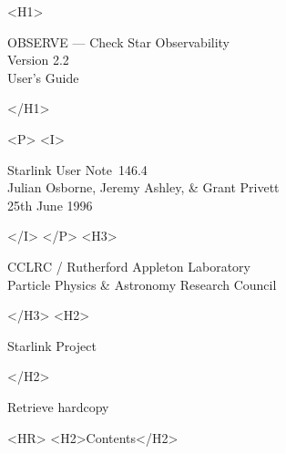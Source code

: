 \documentclass[11pt]{article}
\newcommand{\stardoccategory}  {Starlink User Note}
\newcommand{\stardocsource}    {sun\stardocnumber}
\newcommand{\stardocnumber}    {146.4}
\newcommand{\stardocauthors}   {Julian Osborne, Jeremy Ashley, \& Grant Privett}
\newcommand{\stardocdate}      {25th June 1996}
\newcommand{\stardoctitle}     {OBSERVE --- Check Star Observability}
\newcommand{\stardocversion}   {Version 2.2}
\newcommand{\stardocmanual}    {User's Guide}
\newcommand{\htmladdnormallink}[2]{#1}
\newcommand{\htmladdimg}[1]{}
\newcommand{\htmlref}[2]{#1}
\newcommand{\htmladdtonavigation}[1]{}
\newcommand{\xlabel}[1]{}
\newcommand{\latexonlytoc}[0]{\tableofcontents}
\begin{document}
\begin{htmlonly}
   \xlabel{}
   \begin{rawhtml} <H1> \end{rawhtml}
      \stardoctitle\\
      \stardocversion\\
      \stardocmanual
   \begin{rawhtml} </H1> \end{rawhtml}


   \begin{rawhtml} <P> <I> \end{rawhtml}
   \stardoccategory\ \stardocnumber \\
   \stardocauthors \\
   \stardocdate
   \begin{rawhtml} </I> </P> <H3> \end{rawhtml}
      \htmladdnormallink{CCLRC}{http://www.cclrc.ac.uk} /
      \htmladdnormallink{Rutherford Appleton Laboratory}
                        {http://www.cclrc.ac.uk/ral} \\
      \htmladdnormallink{Particle Physics \& Astronomy Research Council}
                        {http://www.pparc.ac.uk} \\
   \begin{rawhtml} </H3> <H2> \end{rawhtml}
      \htmladdnormallink{Starlink Project}{http://www.starlink.ac.uk/}
   \begin{rawhtml} </H2> \end{rawhtml}
   \htmladdnormallink{\htmladdimg{source.gif} Retrieve hardcopy}
      {http://www.starlink.ac.uk/cgi-bin/hcserver?\stardocsource}\\

  \label{stardoccontents}
  \begin{rawhtml}
    <HR>
    <H2>Contents</H2>
  \end{rawhtml}
  \renewcommand{\latexonlytoc}[0]{}
  \htmladdtonavigation{\htmlref{\htmladdimg{contents_motif.gif}}
        {stardoccontents}}

\end{htmlonly}
\end{document}
